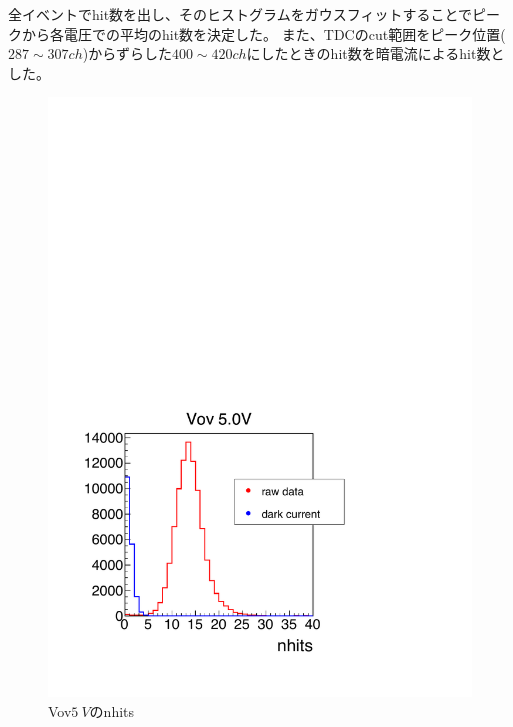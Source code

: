 \documentclass[uplatex, titlepage, dvipdfmx, 12pt, a4paper]{jsreport}
\begin{document}
    全イベントでhit数を出し、そのヒストグラムをガウスフィットすることでピークから各電圧での平均のhit数を決定した。
    また、TDCのcut範囲をピーク位置($287\sim307\si{ch}$)からずらした$400\sim420\si{ch}$にしたときのhit数を暗電流によるhit数とした。
    
    \begin{figure}[h]
      \begin{center} 
        \includegraphics[scale=0.5, clip]{image/Vov5_nhits.pdf}
        \caption{Vov$\SI{5}{V}$のnhits} 
        \label{fig:nhits} 
      \end{center}
    \end{figure}
\end{document}
